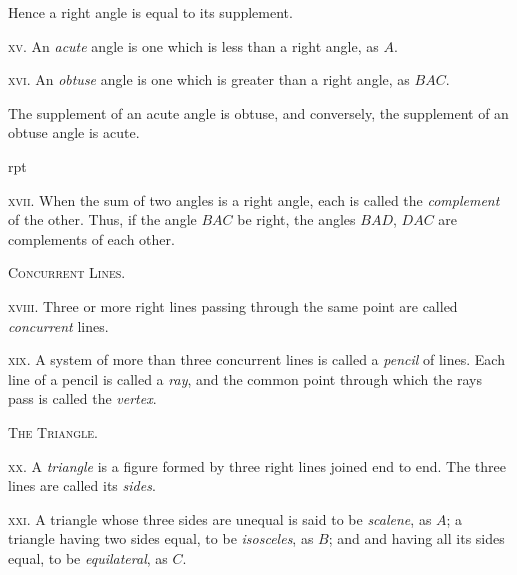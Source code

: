 \documentclass[oneside]{book}
\newcommand\imgflow[3]{
\setcounter{wrapwidth}{#1}
\begin{wrapfigure}[#2]{r}{\value{wrapwidth}pt}
\begin{center}
\vspace{-0.3in}
\end{center}
\end{wrapfigure}
}
\newcommand\imgcent[2]{
\begin{center}
\end{center}
}
\begin{document}
\begin{footnotesize}
Hence a right angle is equal to its supplement.
\par\end{footnotesize}

\textsc{xv}. An \textit{acute} angle is one which is less than a right
angle, as $A$.

\imgcent{266}{f005}

\textsc{xvi}. An \textit{obtuse} angle is one which is greater than a
right angle, as $BAC$.

\begin{footnotesize}
The supplement of an acute angle is obtuse, and conversely, the
supplement of an obtuse
angle is acute.
\par\end{footnotesize}

\imgflow{100}{7}{f006}
\textsc{xvii}. When the sum of two angles
is a right angle, each is called the
\textit{complement} of the other. Thus, if
the angle $BAC$ be right, the angles
$BAD$, $DAC$ are complements of each
other.

\begin{center}
\textsc{Concurrent Lines.}
\end{center}

\textsc{xviii}. Three or more right lines passing through the
same point are called \textit{concurrent} lines.

\textsc{xix}. A system of more than three concurrent lines is
called a \textit{pencil} of lines. Each line of a pencil is called
a \textit{ray}, and the common point through which the rays
pass is called the \textit{vertex}.


\begin{center}
\textsc{The Triangle.}
\end{center}

\textsc{xx}. A \textit{triangle} is a figure formed by three right
lines joined end to end. The three lines are called
its \textit{sides}.

\textsc{xxi}. A triangle whose three sides are unequal is said
to be \textit{scalene}, as $A$; a triangle having two sides equal,
to be \textit{isosceles}, as $B$; and and having all its sides equal,
to be \textit{equilateral}, as $C$.
\end{document}
